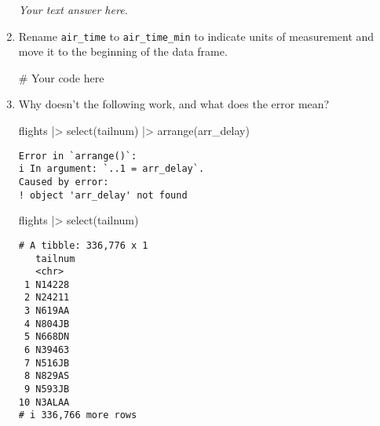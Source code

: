 \documentclass[
  letterpaper,
  DIV=11,
  numbers=noendperiod]{scrreprt}
\newenvironment{Shaded}{\begin{snugshade}}{\end{snugshade}}
\newcommand{\CommentTok}[1]{\textcolor[rgb]{0.37,0.37,0.37}{#1}}
\newcommand{\FunctionTok}[1]{\textcolor[rgb]{0.28,0.35,0.67}{#1}}
\newcommand{\NormalTok}[1]{\textcolor[rgb]{0.00,0.23,0.31}{#1}}
\newcommand{\SpecialCharTok}[1]{\textcolor[rgb]{0.37,0.37,0.37}{#1}}
\begin{document}
\begin{enumerate}
\begin{tcolorbox}
  \emph{Your text answer here.}

  \end{tcolorbox}
\item
  Rename \texttt{air\_time} to \texttt{air\_time\_min} to indicate units
  of measurement and move it to the beginning of the data frame.

  \begin{tcolorbox}[enhanced jigsaw, breakable, bottomtitle=1mm, left=2mm, colback=white, toprule=.15mm, leftrule=.75mm, colframe=quarto-callout-note-color-frame, colbacktitle=quarto-callout-note-color!10!white, title={Answer}, coltitle=black, toptitle=1mm, bottomrule=.15mm, opacitybacktitle=0.6, arc=.35mm, rightrule=.15mm, titlerule=0mm, opacityback=0]

\begin{Shaded}
\begin{Highlighting}[]
\CommentTok{\# Your code here}
\end{Highlighting}
\end{Shaded}

  \end{tcolorbox}
\item
  Why doesn't the following work, and what does the error mean?

\begin{Shaded}
\begin{Highlighting}[]
\NormalTok{flights }\SpecialCharTok{|\textgreater{}} 
  \FunctionTok{select}\NormalTok{(tailnum) }\SpecialCharTok{|\textgreater{}} 
  \FunctionTok{arrange}\NormalTok{(arr\_delay)}
\end{Highlighting}
\end{Shaded}

\begin{verbatim}
Error in `arrange()`:
i In argument: `..1 = arr_delay`.
Caused by error:
! object 'arr_delay' not found
\end{verbatim}

\begin{Shaded}
\begin{Highlighting}[]
\NormalTok{flights }\SpecialCharTok{|\textgreater{}} 
  \FunctionTok{select}\NormalTok{(tailnum)}
\end{Highlighting}
\end{Shaded}

\begin{verbatim}
# A tibble: 336,776 x 1
   tailnum
   <chr>  
 1 N14228 
 2 N24211 
 3 N619AA 
 4 N804JB 
 5 N668DN 
 6 N39463 
 7 N516JB 
 8 N829AS 
 9 N593JB 
10 N3ALAA 
# i 336,766 more rows
\end{verbatim}


\end{enumerate}
\end{document}
